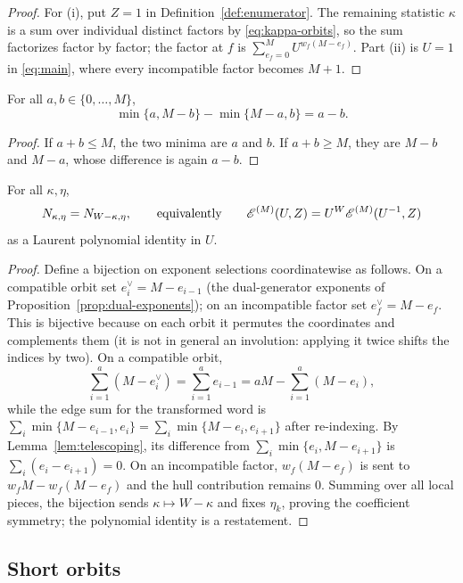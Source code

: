 \begin{proof}
For (i), put $Z=1$ in Definition~\ref{def:enumerator}.  The remaining statistic
$\kappa$ is a sum over individual distinct factors by
\eqref{eq:kappa-orbits}, so the sum factorizes factor by factor; the factor at
$f$ is $\sum_{e_f=0}^{M}U^{w_f(M-e_f)}$.  Part (ii) is $U=1$ in
\eqref{eq:main}, where every incompatible factor becomes $M+1$.
\end{proof}

\begin{lemma}\label{lem:telescoping}
For all $a,b\in\{0,\ldots,M\}$,
\[
\min\{a,M-b\}-\min\{M-a,b\}=a-b.
\]
\end{lemma}

\begin{proof}
If $a+b\leq M$, the two minima are $a$ and $b$.  If $a+b\geq M$, they are
$M-b$ and $M-a$, whose difference is again $a-b$.
\end{proof}

\begin{corollary}\label{cor:symmetry}
For all $\kappa,\eta$,
\[
N_{\kappa,\eta}=N_{W-\kappa,\eta},
\qquad\text{equivalently}\qquad
\mathscr E^{(M)}(U,Z)=U^W\mathscr E^{(M)}(U^{-1},Z)
\]
as a Laurent polynomial identity in $U$.
\end{corollary}

\begin{proof}
Define a bijection on exponent selections coordinatewise as follows.  On a
compatible orbit set $e_i^\vee=M-e_{i-1}$ (the dual-generator exponents of
Proposition~\ref{prop:dual-exponents}); on an incompatible factor set
$e_f^\vee=M-e_f$.  This is bijective because on each orbit it permutes the
coordinates and complements them (it is not in general an involution: applying
it twice shifts the indices by two).  On a
compatible orbit,
\[
\sum_{i=1}^{a}(M-e_i^\vee)=\sum_{i=1}^{a}e_{i-1}
   =aM-\sum_{i=1}^{a}(M-e_i),
\]
while the edge sum for the transformed word is
$\sum_i\min\{M-e_{i-1},e_i\}
 =\sum_i\min\{M-e_i,e_{i+1}\}$ after re-indexing.  By
Lemma~\ref{lem:telescoping}, its difference from
$\sum_i\min\{e_i,M-e_{i+1}\}$ is $\sum_i(e_i-e_{i+1})=0$.  On an incompatible
factor, $w_f(M-e_f)$ is sent to $w_fM-w_f(M-e_f)$ and the hull contribution
remains $0$.  Summing over all local pieces, the bijection sends
$\kappa\mapsto W-\kappa$ and fixes $\eta_k$, proving the coefficient symmetry;
the polynomial identity is a restatement.
\end{proof}

\subsection{Short orbits}\label{sec:short-orbits}

